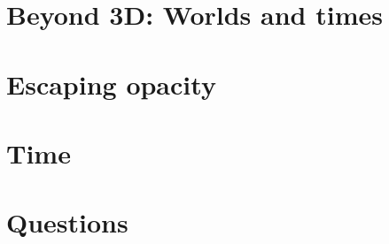 \documentclass{kvf-tufte-VDQI}
\begin{document}
\dominitoc


\mainmatter

\nopartblankpage
\part{Beyond 3D: Worlds and times}






\part{Escaping opacity}




\part{Time}



\part{Questions}



\backmatter

\printbibliography[heading=bibliographypart]
\end{document}
